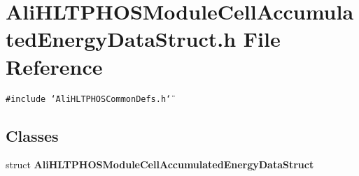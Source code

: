 \section{Ali\-HLTPHOSModule\-Cell\-Accumulated\-Energy\-Data\-Struct.h File Reference}
\label{AliHLTPHOSModuleCellAccumulatedEnergyDataStruct_8h}


{\tt \#include \char`\"{}Ali\-HLTPHOSCommon\-Defs.h\char`\"{}}\par
\subsection*{Classes}
\begin{CompactItemize}
\item 
struct {\bf Ali\-HLTPHOSModule\-Cell\-Accumulated\-Energy\-Data\-Struct}
\end{CompactItemize}
